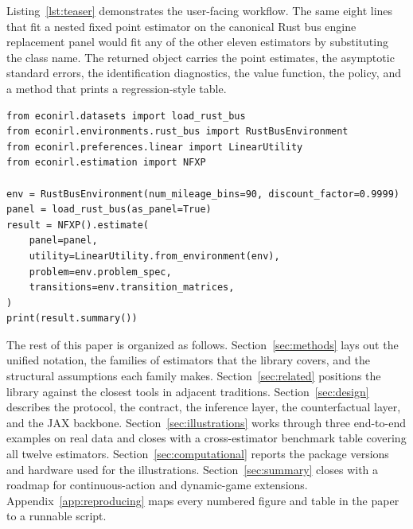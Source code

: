 Listing~\ref{lst:teaser} demonstrates the user-facing workflow. The same eight lines that fit a nested fixed point estimator on the canonical Rust bus engine replacement panel would fit any of the other eleven estimators by substituting the class name. The returned  object carries the point estimates, the asymptotic standard errors, the identification diagnostics, the value function, the policy, and a  method that prints a regression-style table.

\begin{lstlisting}[style=econirlpython,caption={Fitting NFXP on the Rust bus panel and printing the result. Reproduced by \code{code\_snippets/teaser\_nfxp\_rust.py}.},label={lst:teaser}]
from econirl.datasets import load_rust_bus
from econirl.environments.rust_bus import RustBusEnvironment
from econirl.preferences.linear import LinearUtility
from econirl.estimation import NFXP

env = RustBusEnvironment(num_mileage_bins=90, discount_factor=0.9999)
panel = load_rust_bus(as_panel=True)
result = NFXP().estimate(
    panel=panel,
    utility=LinearUtility.from_environment(env),
    problem=env.problem_spec,
    transitions=env.transition_matrices,
)
print(result.summary())
\end{lstlisting}

The rest of this paper is organized as follows. Section~\ref{sec:methods} lays out the unified notation, the families of estimators that the library covers, and the structural assumptions each family makes. Section~\ref{sec:related} positions the library against the closest tools in adjacent traditions. Section~\ref{sec:design} describes the  protocol, the  contract, the inference layer, the counterfactual layer, and the JAX backbone. Section~\ref{sec:illustrations} works through three end-to-end examples on real data and closes with a cross-estimator benchmark table covering all twelve estimators. Section~\ref{sec:computational} reports the package versions and hardware used for the illustrations. Section~\ref{sec:summary} closes with a roadmap for continuous-action and dynamic-game extensions. Appendix~\ref{app:reproducing} maps every numbered figure and table in the paper to a runnable script.
